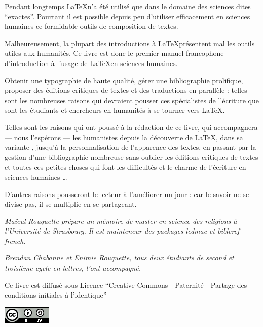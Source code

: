 \thispagestyle{empty}

Pendant longtemps \LaTeX n'a été utilisé que dans le domaine des sciences dites \enquote{exactes}.
Pourtant il est possible depuis peu d'utiliser efficacement en sciences humaines ce formidable outils de composition de textes.

Malheureusement, la plupart des introductions à \LaTeX présentent mal les outils utiles aux humanités. Ce livre est donc le premier manuel francophone d'introduction à l'usage de \LaTeX en sciences humaines.

Obtenir une typographie de haute qualité, gérer une bibliographie prolifique, proposer des éditions critiques de textes et des traductions en parallèle : telles sont les nombreuses raisons qui devraient pousser ces spécialistes de l'écriture que sont les étudiants et chercheurs en humanités à se tourner vers \LaTeX.

Telles sont les raisons qui ont poussé à la rédaction de ce livre, qui accompagnera --- nous l'espérons --- les humanistes depuis la découverte de \LaTeX, dans sa variante \XeLaTeX, jusqu'à la personnalisation de l'apparence des textes, en passant par la gestion d'une bibliographie nombreuse sans oublier les éditions critiques de textes et toutes ces petites choses qui font les difficultés et le charme de l'écriture en sciences humaines \ldots

D'autres raisons pousseront le lecteur à l'améliorer un jour : car le savoir ne se divise pas, il se multiplie en se partageant.

\vspace{4ex}

\scriptsize
\emph{
Maïeul Rouquette prépare un mémoire de master en science des religions à l'Université de Strasbourg.} 
\emph{Il est mainteneur des packages \emph{ledmac} et \emph{bibleref-french}.}


\emph{Brendan Chabanne et Enimie Rouquette, tous deux étudiants  de second et troisième cycle en lettres, l'ont accompagné.}

\normalsize

\vspace{4ex}
Ce livre est diffusé sous Licence \enquote{Creative Commons - Paternité - Partage des conditions initiales à l'identique}

\vspace{2ex}
 \raggedleft\includegraphics[height=3ex]{images/cc.png}
